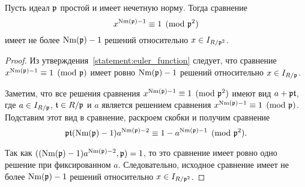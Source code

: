 \documentclass[_00_dissertation.tex]{subfiles}
\begin{document}
\begin{proposition}\label{proposition:miller_criteria_character}
    Пусть идеал $\mathfrak{p}$ простой и имеет нечетную норму.
    Тогда сравнение
    \begin{equation*}
        x^{\textrm{Nm}(\mathfrak{p}) - 1} \equiv 1 \pmod{\mathfrak{p}^2}
    \end{equation*}
    имеет не более $\textrm{Nm}(\mathfrak{p}) - 1$ решений относительно $x \in I_{R/\mathfrak{p}^2}$.
\end{proposition}
\begin{proof}
    Из утверждения~\ref{statement:euler_function} следует, что сравнение $x^{\textrm{Nm}(\mathfrak{p}) - 1} \equiv 1 \pmod{\mathfrak{p}}$ имеет ровно $\textrm{Nm}(\mathfrak{p}) - 1$ решений относительно $x \in I_{R/\mathfrak{p}}$.
    
    Заметим, что все решения сравнения $x^{\textrm{Nm}(\mathfrak{p}) - 1} \equiv 1 \pmod{\mathfrak{p}^2}$ имеют вид $a + \mathfrak{p}\mathfrak{t}$, где $a \in I_{R/\mathfrak{p}}$, $\mathfrak{t} \in R/\mathfrak{p}$ и $a$ является решением сравнения $x^{\textrm{Nm}(\mathfrak{p}) - 1} \equiv 1 \pmod{\mathfrak{p}}$.
    Подставим этот вид в сравнение, раскроем скобки и получим сравнение
    \begin{equation*}
        \mathfrak{p}\mathfrak{t}(\textrm{Nm}(\mathfrak{p}) - 1)a^{\textrm{Nm}(\mathfrak{p}) - 2} \equiv 1 - a^{\textrm{Nm}(\mathfrak{p}) - 1} \pmod{\mathfrak{p}^2}.
    \end{equation*}
    
    Так как $((\textrm{Nm}(\mathfrak{p}) - 1)a^{\textrm{Nm}(\mathfrak{p}) - 2}, \mathfrak{p}) = 1$, то это сравнение имеет ровно одно решение при фиксированном $a$.
    Следовательно, исходное сравнение имеет не более $\textrm{Nm}(\mathfrak{p}) - 1$ решений относительно $x \in I_{R/\mathfrak{p}^2}$.
\end{proof}
\end{document}
